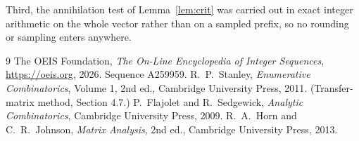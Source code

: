\documentclass[11pt,a4paper]{article}
\theoremstyle{plain}
\theoremstyle{definition}
\begin{document}
Third, the annihilation test of Lemma~\ref{lem:crit} was carried out in exact integer
arithmetic on the whole vector rather than on a sampled prefix, so no rounding or sampling
enters anywhere.

\begin{thebibliography}{9}
 The OEIS Foundation, \emph{The On-Line Encyclopedia of Integer
Sequences}, \url{https://oeis.org}, 2026. Sequence A259959.
 R.~P.~Stanley, \emph{Enumerative Combinatorics}, Volume 1, 2nd ed.,
Cambridge University Press, 2011. (Transfer-matrix method, Section 4.7.)
 P.~Flajolet and R.~Sedgewick, \emph{Analytic Combinatorics}, Cambridge
University Press, 2009.
 R.~A.~Horn and C.~R.~Johnson, \emph{Matrix Analysis}, 2nd ed., Cambridge
University Press, 2013.
\end{thebibliography}
\end{document}
